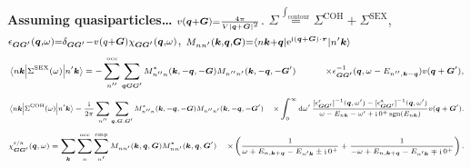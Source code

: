 \documentclass[t]{beamer}
\DeclareMathOperator{\ee}{e}
\DeclareMathOperator{\ii}{i}
\DeclareMathOperator{\sgn}{sgn}
\def\\{}%
\begin{document}
\begin{frame}[allowframebreaks]
\textbf{Assuming quasiparticles\dots} 
$\scriptstyle v(\vb*{q} + \vb*{G}) = \frac{4\pi }{V \abs*{\vb*{q} + \vb*{G}}^2}$.
$\scriptstyle \Sigma \stackrel{\int_{\text{contour}}}{=} \Sigma^{\text{COH}} + \Sigma^{\text{SEX}}$,
$\scriptstyle \epsilon_{\vb*{G} \vb*{G}'}(\vb*{q}, \omega) = \delta_{\vb*{G} \vb*{G}'} - v(q + \vb*{G}) \chi_{\vb*{G} \vb*{G}'}(\vb*{q}, \omega)$, 
$\scriptstyle M_{n n'}(\vb*{k}, \vb*{q}, \vb*{G}) = \mel*{n \vb*{k} + \vb*{q}}{\ee^{\ii (\vb*{q} + \vb*{G}) \cdot \vb*{r}}}{n' \vb*{k}}$
\begin{equation}
    \scriptsize
    \begin{aligned}
    \mel{n \vb*{k}}{\Sigma^{\text{SEX}}(\omega)}{n' \vb*{k}} 
    &= - \sum_{n''}^{\text{occ}} \sum_{\vb*{q} \vb*{G} \vb*{G}'}
    M^*_{n'' n} (\vb*{k}, - \vb*{q}, - \vb*{G}) M_{n'' n'} (\vb*{k}, - \vb*{q},  -\vb*{G}') \\
    &\quad\quad \times  \epsilon^{-1}_{\vb*{G} \vb*{G}'}(\vb*{q}, \omega - E_{n'', \vb*{k} - \vb*{q}}) 
    v(\vb*{q} + \vb*{G}') ,
    \end{aligned}
    \label{eq:sex}
\end{equation}
\begin{equation}
    \scriptsize
    \begin{aligned}
        \mel{n \vb*{k}}{\Sigma^{\text{COH}}(\omega)}{n' \vb*{k}} 
        &= \frac{\ii}{2\pi} \sum_{n''} \sum_{\vb*{q}, \vb*{G}, \vb*{G}'} 
        M^*_{n'' n} (\vb*{k}, - \vb*{q}, - \vb*{G})  M_{n'' n'} (\vb*{k}, - \vb*{q},  -\vb*{G}') \\
        & \times \int_{0}^{\infty} \dd{\omega'} 
        \frac{
            [\epsilon^{\text{r}}_{\vb*{G} \vb*{G}'}]^{-1} (\vb*{q}, \omega')
            - [\epsilon^{\text{a}}_{\vb*{G} \vb*{G}'}]^{-1} (\vb*{q}, \omega') 
        }{\omega - E_{n \vb*{k}} - \omega' + \ii 0^+ \sgn(E_{n \vb*{k}})} v(\vb*{q}+\vb*{G}') .
    \end{aligned}
    \label{eq:coh}
\end{equation}
\begin{equation}
    \scriptsize
    \begin{aligned}
        \chi^{\text{r/a}}_{\vb*{G} \vb*{G}'}(\vb*{q}, \omega)
        &= \sum_{\vb*{k}} \sum_{n}^{\text{occ}} \sum_{n'}^{\text{emp}} 
        M_{n n'} (\vb*{k}, \vb*{q}, \vb*{G}) M^*_{nn'} (\vb*{k}, \vb*{q}, \vb*{G}') \\
        &\times \left(
        \frac{
            1
        }{
            \omega + E_{n, \vb*{k} + \vb*{q}} - E_{n' \vb*{k}} \pm \ii 0^+
        }
        + \frac{
            1
        }{
            - \omega + E_{n, \vb*{k} + \vb*{q}} - E_{n' \vb*{k}} \mp \ii 0^+
        }
        \right).
    \end{aligned}
    \label{eq:chi}
\end{equation}


\end{frame}
\end{document}
